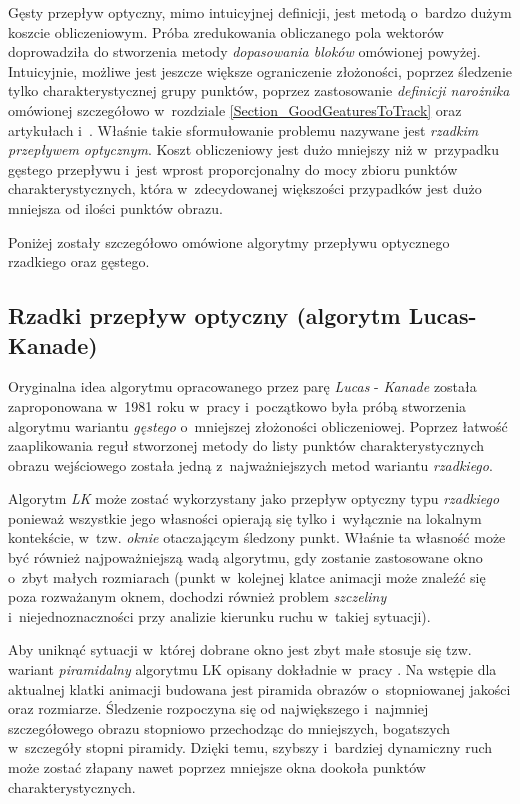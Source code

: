     Gęsty przepływ optyczny, mimo intuicyjnej definicji, jest metodą o~bardzo dużym koszcie obliczeniowym. Próba zredukowania obliczanego pola wektorów doprowadziła do stworzenia metody \textit{dopasowania bloków} omówionej powyżej. Intuicyjnie, możliwe jest jeszcze większe ograniczenie złożoności, poprzez śledzenie tylko charakterystycznej grupy punktów, poprzez zastosowanie \textit{definicji narożnika} omówionej szczegółowo w~rozdziale \ref{Section_GoodGeaturesToTrack} oraz artykułach \cite{LucasKanadeTracker81} i~\cite{GoodFeaturesToTrack94}. Właśnie takie sformułowanie problemu nazywane jest \textit{rzadkim przepływem optycznym}. Koszt obliczeniowy jest dużo mniejszy niż w~przypadku gęstego przepływu i~jest wprost proporcjonalny do mocy zbioru punktów charakterystycznych, która w~zdecydowanej większości przypadków jest dużo mniejsza od ilości punktów obrazu.

    Poniżej zostały szczegółowo omówione algorytmy przepływu optycznego rzadkiego oraz gęstego.

    \subsection{Rzadki przepływ optyczny (algorytm Lucas-Kanade)}
    Oryginalna idea algorytmu opracowanego przez parę \textit{Lucas} - \textit{Kanade} została zaproponowana w~1981 roku w~pracy \cite{LucasKanadeTracker81} i~początkowo była próbą stworzenia algorytmu wariantu \textit{gęstego} o~mniejszej złożoności obliczeniowej. Poprzez łatwość zaaplikowania reguł stworzonej metody do listy punktów charakterystycznych obrazu wejściowego została jedną z~najważniejszych metod wariantu \textit{rzadkiego}.

    Algorytm \textit{LK} może zostać wykorzystany jako przepływ optyczny typu \textit{rzadkiego} ponieważ wszystkie jego własności opierają się tylko i~wyłącznie na lokalnym kontekście, w~tzw. \textit{oknie} otaczającym śledzony punkt. Właśnie ta własność może być również najpoważniejszą wadą algorytmu, gdy zostanie zastosowane okno o~zbyt małych rozmiarach (punkt w~kolejnej klatce animacji może znaleźć się poza rozważanym oknem, dochodzi również problem \textit{szczeliny} i~niejednoznaczności przy analizie kierunku ruchu w~takiej sytuacji).

    Aby uniknąć sytuacji w~której dobrane okno jest zbyt małe stosuje się tzw. wariant \textit{piramidalny} algorytmu LK opisany dokładnie w~pracy \cite{OpenCvOpticalFlow04}. Na wstępie dla aktualnej klatki animacji budowana jest piramida obrazów o~stopniowanej jakości oraz rozmiarze. Śledzenie rozpoczyna się od największego i~najmniej szczegółowego obrazu stopniowo przechodząc do mniejszych, bogatszych w~szczegóły stopni piramidy. Dzięki temu, szybszy i~bardziej dynamiczny ruch może zostać złapany nawet poprzez mniejsze okna dookoła punktów charakterystycznych.

